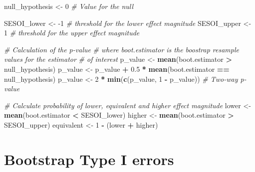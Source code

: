\documentclass[
]{book}
\newenvironment{Shaded}{\begin{snugshade}}{\end{snugshade}}
\newcommand{\CommentTok}[1]{\textcolor[rgb]{0.56,0.35,0.01}{\textit{#1}}}
\newcommand{\DecValTok}[1]{\textcolor[rgb]{0.00,0.00,0.81}{#1}}
\newcommand{\FloatTok}[1]{\textcolor[rgb]{0.00,0.00,0.81}{#1}}
\newcommand{\KeywordTok}[1]{\textcolor[rgb]{0.13,0.29,0.53}{\textbf{#1}}}
\newcommand{\NormalTok}[1]{#1}
\newcommand{\OperatorTok}[1]{\textcolor[rgb]{0.81,0.36,0.00}{\textbf{#1}}}
\newcommand{\StringTok}[1]{\textcolor[rgb]{0.31,0.60,0.02}{#1}}
\begin{document}
\begin{Shaded}
\begin{Highlighting}[]
\NormalTok{null\_hypothesis <{-}}\StringTok{ }\DecValTok{0} \CommentTok{\# Value for the null}

\NormalTok{SESOI\_lower <{-}}\StringTok{ }\DecValTok{{-}1} \CommentTok{\# threshold for the \textquotesingle{}lower\textquotesingle{} effect magnitude}
\NormalTok{SESOI\_upper <{-}}\StringTok{ }\DecValTok{1} \CommentTok{\# threshold for the \textquotesingle{}upper\textquotesingle{} effect magnitude}

\CommentTok{\# Calculation of the p{-}value}
\CommentTok{\# where boot.estimator is the boostrap resample values for the estimator}
\CommentTok{\# of interest}
\NormalTok{p\_value <{-}}\StringTok{ }\KeywordTok{mean}\NormalTok{(boot.estimator }\OperatorTok{>}\StringTok{ }\NormalTok{null\_hypothesis)}
\NormalTok{p\_value <{-}}\StringTok{ }\NormalTok{p\_value }\OperatorTok{+}\StringTok{ }\FloatTok{0.5} \OperatorTok{*}\StringTok{ }\KeywordTok{mean}\NormalTok{(boot.estimator }\OperatorTok{==}\StringTok{ }\NormalTok{null\_hypothesis)}
\NormalTok{p\_value <{-}}\StringTok{ }\DecValTok{2} \OperatorTok{*}\StringTok{ }\KeywordTok{min}\NormalTok{(}\KeywordTok{c}\NormalTok{(p\_value, }\DecValTok{1} \OperatorTok{{-}}\StringTok{ }\NormalTok{p\_value)) }\CommentTok{\# Two{-}way p{-}value}

\CommentTok{\# Calculate probability of lower, equivalent and higher effect magnitude}
\NormalTok{lower <{-}}\StringTok{ }\KeywordTok{mean}\NormalTok{(boot.estimator }\OperatorTok{<}\StringTok{ }\NormalTok{SESOI\_lower)}
\NormalTok{higher <{-}}\StringTok{ }\KeywordTok{mean}\NormalTok{(boot.estimator }\OperatorTok{>}\StringTok{ }\NormalTok{SESOI\_upper)}
\NormalTok{equivalent <{-}}\StringTok{ }\DecValTok{1} \OperatorTok{{-}}\StringTok{ }\NormalTok{(lower }\OperatorTok{+}\StringTok{ }\NormalTok{higher)}
\end{Highlighting}
\end{Shaded}

\hypertarget{bootstrap-type-i-errors}{%
\section{Bootstrap Type I errors}\label{bootstrap-type-i-errors}}
\end{document}
